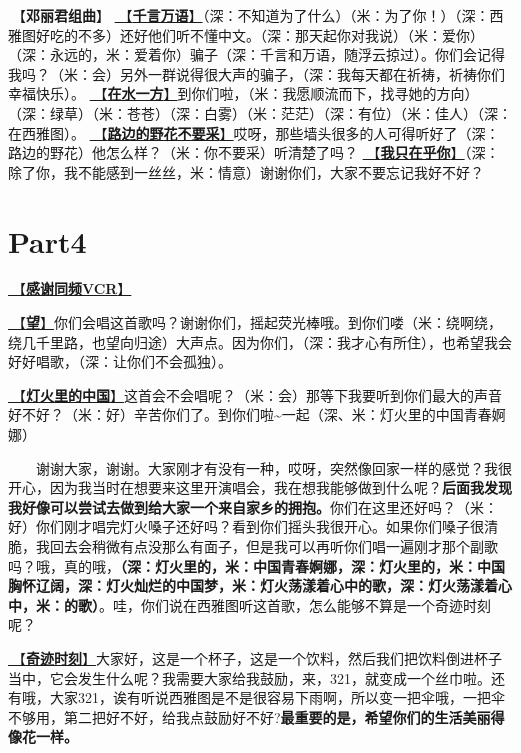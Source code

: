 \documentclass[]{ctexbook}
\begin{document}
🎵【\textbf{邓丽君组曲}】
\hyperref[thousands-of-words]{🎵【\textbf{千言万语}】}（深：不知道为了什么）（米：为了你！）（深：西雅图好吃的不多）还好他们听不懂中文。（深：那天起你对我说）（米：爱你）（深：永远的，米：爱着你）骗子（深：千言和万语，随浮云掠过）。你们会记得我吗？（米：会）另外一群说得很大声的骗子，（深：我每天都在祈祷，祈祷你们幸福快乐）。
\hyperref[on-the-water-side]{🎵【\textbf{在水一方}】}到你们啦，（米：我愿顺流而下，找寻她的方向）（深：绿草）（米：苍苍）（深：白雾）（米：茫茫）（深：有位）（米：佳人）（深：在西雅图）。
\hyperref[only-with-me]{🎵【\textbf{路边的野花不要采}】}哎呀，那些墙头很多的人可得听好了（深：路边的野花）他怎么样？（米：你不要采）听清楚了吗？
\hyperref[only-you]{🎵【\textbf{我只在乎你}】}（深：除了你，我不能感到一丝丝，米：情意）谢谢你们，大家不要忘记我好不好？

\section{Part4}\label{Seattle-20250305-part4}

\hyperref[thank-you-vcr]{🎥【\textbf{感谢同频VCR}】}

\hyperref[hope]{🎵【\textbf{望}】}你们会唱这首歌吗？谢谢你们，摇起荧光棒哦。到你们喽（米：绕啊绕，绕几千里路，也望向归途）大声点。因为你们，（深：我才心有所住），也希望我会好好唱歌，（深：让你们不会孤独）。

\hyperref[China-in-the-light]{🎵【\textbf{灯火里的中国}】}这首会不会唱呢？（米：会）那等下我要听到你们最大的声音好不好？（米：好）辛苦你们了。到你们啦\textasciitilde 一起（深、米：灯火里的中国青春婀娜）

  谢谢大家，谢谢。大家刚才有没有一种，哎呀，突然像回家一样的感觉？我很开心，因为我当时在想要来这里开演唱会，我在想我能够做到什么呢？\textbf{后面我发现我好像可以尝试去做到给大家一个来自家乡的拥抱。}你们在这里还好吗？（米：好）你们刚才唱完灯火嗓子还好吗？看到你们摇头我很开心。如果你们嗓子很清脆，我回去会稍微有点没那么有面子，但是我可以再听你们唱一遍刚才那个副歌吗？哦，真的哦，\textbf{（深：灯火里的，米：中国青春婀娜，深：灯火里的，米：中国胸怀辽阔，深：灯火灿烂的中国梦，米：灯火荡漾着心中的歌，深：灯火荡漾着心中，米：的歌）}。哇，你们说在西雅图听这首歌，怎么能够不算是一个奇迹时刻呢？

\hyperref[magic-moment]{🎵【\textbf{奇迹时刻}】}大家好，这是一个杯子，这是一个饮料，然后我们把饮料倒进杯子当中，它会发生什么呢？我需要大家给我鼓励，来，321，就变成一个丝巾啦。还有哦，大家321，诶有听说西雅图是不是很容易下雨啊，所以变一把伞哦，一把伞不够用，第二把好不好，给我点鼓励好不好?\textbf{最重要的是，希望你们的生活美丽得像花一样。}
\end{document}
